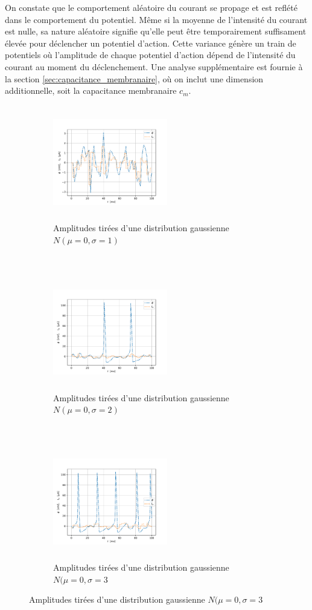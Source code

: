 \documentclass{article}
\begin{document}
On constate que le comportement aléatoire du courant se propage et est reflété dans le comportement du potentiel. Même si la moyenne de l'intensité du courant est nulle, sa nature aléatoire signifie qu'elle peut être temporairement suffisament élevée pour déclencher un potentiel d'action. Cette variance génère un train de potentiels où l'amplitude de chaque potentiel d'action dépend de l'intensité du courant au moment du déclenchement. Une analyse supplémentaire est fournie à la section \ref{sec:capacitance_membranaire}, où on inclut une dimension additionnelle, soit la capacitance membranaire $c_m$.


\begin{figure}[H]
	\begin{subfigure}{0.5\linewidth}
		\includegraphics[width=5cm, height=5cm]{random_curr_1.pdf}
		\centering
		\caption{Amplitudes tirées d'une distribution gaussienne $N(\mu = 0, \sigma = 1)$}
		\label{fig:random_1}
	\end{subfigure}
	~
	\begin{subfigure}{0.5\linewidth}
		\includegraphics[width=5cm, height=5cm]{random_curr_2.pdf}
		\centering
		\caption{Amplitudes tirées d'une distribution gaussienne $N(\mu = 0, \sigma = 2)$}
		\label{fig:random_2}
	\end{subfigure}
	~
	\begin{center}
		\begin{subfigure}{0.5\linewidth}
		\includegraphics[width=5cm, height=5cm]{random_curr_3.pdf}
		\centering
		\caption{Amplitudes tirées d'une distribution gaussienne $N(\mu = 0, \sigma = 3$}
		\label{fig:random_3}
		\end{subfigure}
	\end{center}


\end{figure}
\end{document}
